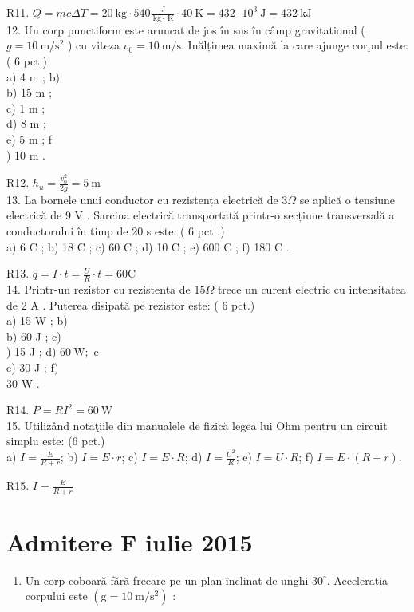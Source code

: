 R11. $Q=m c \Delta T=20 \mathrm{~kg} \cdot 540 \frac{\mathrm{~J}}{\mathrm{~kg} \cdot \mathrm{~K}} \cdot 40 \mathrm{~K}=432 \cdot 10^{3} \mathrm{~J}=432 \mathrm{~kJ}$\\
12. Un corp punctiform este aruncat de jos în sus în câmp gravitational ( $g=10 \mathrm{~m} / \mathrm{s}^{2}$ ) cu viteza $v_{0}=10 \mathrm{~m} / \mathrm{s}$. Inălțimea maximă la care ajunge corpul este: ( 6 pct.)\\
a) 4 m ; b)\\
b) 15 m ;\\
c) 1 m ;\\
d) 8 m ;\\
e) 5 m ; f\\
) 10 m .

R12. $h_{u}=\frac{v_{0}^{2}}{2 g}=5 \mathrm{~m}$\\
13. La bornele unui conductor cu rezistența electrică de $3 \Omega$ se aplică o tensiune electrică de 9 V . Sarcina electrică transportată printr-o secțiune transversală a conductorului în timp de 20 s este: ( 6 pct .)\\
a) 6 C ; b) 18 C ; c) 60 C ; d) 10 C ; e) 600 C ; f) 180 C .

R13. $q=I \cdot t=\frac{U}{R} \cdot t=60 \mathrm{C}$\\
14. Printr-un rezistor cu rezistenta de $15 \Omega$ trece un curent electric cu intensitatea de 2 A . Puterea disipată pe rezistor este: ( 6 pct.)\\
a) 15 W ; b)\\
b) 60 J ; c)\\
) 15 J ; d) $60 \mathrm{~W} ;$ e\\
e) 30 J ; f)\\
30 W .

R14. $P=R I^{2}=60 \mathrm{~W}$\\
15. Utilizând notaţiile din manualele de fizică legea lui Ohm pentru un circuit simplu este: (6 pct.)\\
a) $I=\frac{E}{R+r}$; b) $I=E \cdot r$; c) $I=E \cdot R$; d) $I=\frac{U^{2}}{R}$; e) $I=U \cdot R$; f) $I=E \cdot(R+r)$.

R15. $I=\frac{E}{R+r}$

\section{Admitere F iulie 2015}

\begin{enumerate}
  \item Un corp coboară fără frecare pe un plan înclinat de unghi $30^{\circ}$. Accelerația corpului este $\left(\mathrm{g}=10 \mathrm{~m} / \mathrm{s}^{2}\right)$ :
\end{enumerate}

